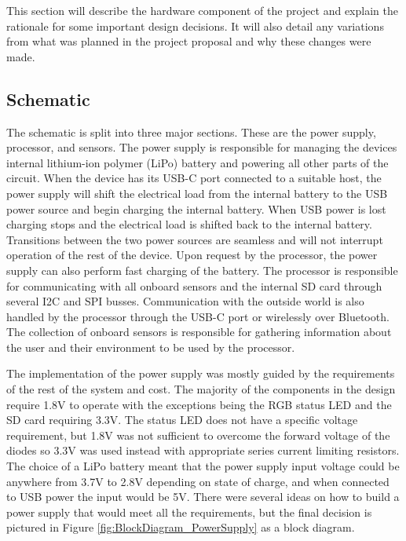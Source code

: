 This section will describe the hardware component of the project and explain 
the rationale for some important design decisions. It will also detail any 
variations from what was planned in the project proposal and why these changes
were made.

\subsection{Schematic}

The schematic is split into three major sections. These are the power supply, 
processor, and sensors. The power supply is responsible for managing the 
devices internal lithium-ion polymer (LiPo) battery and powering all other 
parts of the circuit. When the device has its USB-C port connected to a 
suitable host, the power supply will shift the electrical load from the 
internal battery to the USB power source and begin charging the internal 
battery. When USB power is lost charging stops and the electrical load is 
shifted back to the internal battery. Transitions between the two power 
sources are seamless and will not interrupt operation of the rest of the 
device. Upon request by the processor, the power supply can also perform fast 
charging of the battery. The processor is responsible for communicating with 
all onboard sensors and the internal SD card through several I2C and SPI 
busses. Communication with the outside world is also handled by the processor 
through the USB-C port or wirelessly over Bluetooth. The collection of onboard 
sensors is responsible for gathering information about the user and their 
environment to be used by the processor.

The implementation of the power supply was mostly guided by the requirements of 
the rest of the system and cost. The majority of the components in the design 
require 1.8V to operate with the exceptions being the RGB status LED and the SD 
card requiring 3.3V. The status LED does not have a specific voltage 
requirement, but 1.8V was not sufficient to overcome the forward voltage of the 
diodes so 3.3V was used instead with appropriate series current limiting 
resistors. The choice of a LiPo battery meant that the power supply input 
voltage could be anywhere from 3.7V to 2.8V depending on state of charge, and 
when connected to USB power the input would be 5V. There were several ideas on 
how to build a power supply that would meet all the requirements, but the final 
decision is pictured in Figure \ref{fig:BlockDiagram_PowerSupply} as a block 
diagram.

